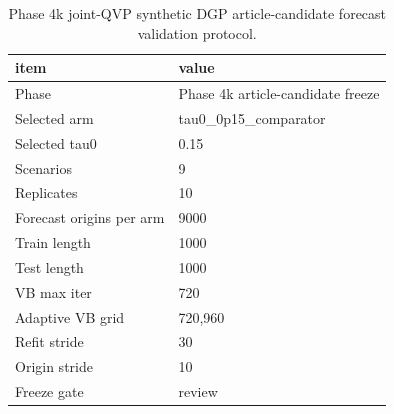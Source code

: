 \begin{table}[t]
\centering
\small
\begin{tabular}{@{}ll@{}}
\toprule
item & value
\\
\midrule
Phase & Phase 4k article-candidate freeze \\
Selected arm & tau0\_0p15\_comparator \\
Selected tau0 & 0.15 \\
Scenarios & 9 \\
Replicates & 10 \\
Forecast origins per arm & 9000 \\
Train length & 1000 \\
Test length & 1000 \\
VB max iter & 720 \\
Adaptive VB grid & 720,960 \\
Refit stride & 30 \\
Origin stride & 10 \\
Freeze gate & review \\
\bottomrule
\end{tabular}
\caption{Phase 4k joint-QVP synthetic DGP article-candidate forecast validation protocol.}
\label{tab:joint-qvp-phase4k-protocol}
\end{table}

